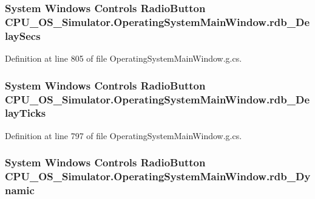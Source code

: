 \subsubsection[{rdb\+\_\+\+Delay\+Secs}]{\setlength{\rightskip}{0pt plus 5cm}System Windows Controls Radio\+Button C\+P\+U\+\_\+\+O\+S\+\_\+\+Simulator.\+Operating\+System\+Main\+Window.\+rdb\+\_\+\+Delay\+Secs\hspace{0.3cm}{\ttfamily [package]}}\label{class_c_p_u___o_s___simulator_1_1_operating_system_main_window_a7b4585b869d26fa4e7d419a064f4f73c}


Definition at line 805 of file Operating\+System\+Main\+Window.\+g.\+cs.

\hypertarget{class_c_p_u___o_s___simulator_1_1_operating_system_main_window_a7b70deef80df6719fc0b7b9c87c268d7}{}
\subsubsection[{rdb\+\_\+\+Delay\+Ticks}]{\setlength{\rightskip}{0pt plus 5cm}System Windows Controls Radio\+Button C\+P\+U\+\_\+\+O\+S\+\_\+\+Simulator.\+Operating\+System\+Main\+Window.\+rdb\+\_\+\+Delay\+Ticks\hspace{0.3cm}{\ttfamily [package]}}\label{class_c_p_u___o_s___simulator_1_1_operating_system_main_window_a7b70deef80df6719fc0b7b9c87c268d7}


Definition at line 797 of file Operating\+System\+Main\+Window.\+g.\+cs.

\hypertarget{class_c_p_u___o_s___simulator_1_1_operating_system_main_window_a9d7779e13ed1b78c4387933df4b40d24}{}
\subsubsection[{rdb\+\_\+\+Dynamic}]{\setlength{\rightskip}{0pt plus 5cm}System Windows Controls Radio\+Button C\+P\+U\+\_\+\+O\+S\+\_\+\+Simulator.\+Operating\+System\+Main\+Window.\+rdb\+\_\+\+Dynamic\hspace{0.3cm}{\ttfamily [package]}}\label{class_c_p_u___o_s___simulator_1_1_operating_system_main_window_a9d7779e13ed1b78c4387933df4b40d24}


